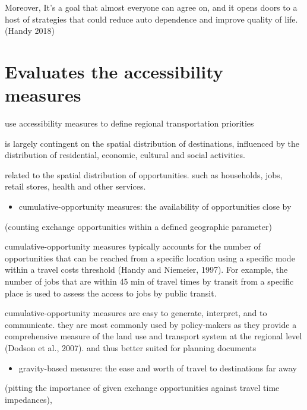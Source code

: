 \documentclass[12pt,]{article}
\providecommand{\tightlist}{%
  \setlength{\itemsep}{0pt}\setlength{\parskip}{0pt}}
\begin{document}
Moreover, It's a goal that almost everyone can agree on, and it opens
doors to a host of strategies that could reduce auto dependence and
improve quality of life. (Handy 2018)

\hypertarget{evaluates-the-accessibility-measures}{%
\section{Evaluates the accessibility
measures}\label{evaluates-the-accessibility-measures}}

use accessibility measures to define regional transportation priorities

is largely contingent on the spatial distribution of destinations,
influenced by the distribution of residential, economic, cultural and
social activities.

related to the spatial distribution of opportunities. such as
households, jobs, retail stores, health and other services.

\begin{itemize}
\tightlist
\item
  cumulative-opportunity measures: the availability of opportunities
  close by
\end{itemize}

(counting exchange opportunities within a defined geographic parameter)

cumulative-opportunity measures typically accounts for the number of
opportunities that can be reached from a specific location using a
specific mode within a travel costs threshold (Handy and Niemeier,
1997). For example, the number of jobs that are within 45 min of travel
times by transit from a specific place is used to assess the access to
jobs by public transit.

cumulative-opportunity measures are easy to generate, interpret, and to
communicate. they are most commonly used by policy-makers as they
provide a comprehensive measure of the land use and transport system at
the regional level (Dodson et al., 2007). and thus better suited for
planning documents

\begin{itemize}
\tightlist
\item
  gravity-based measure: the ease and worth of travel to destinations
  far away
\end{itemize}

(pitting the importance of given exchange opportunities against travel
time impedances),
\end{document}
